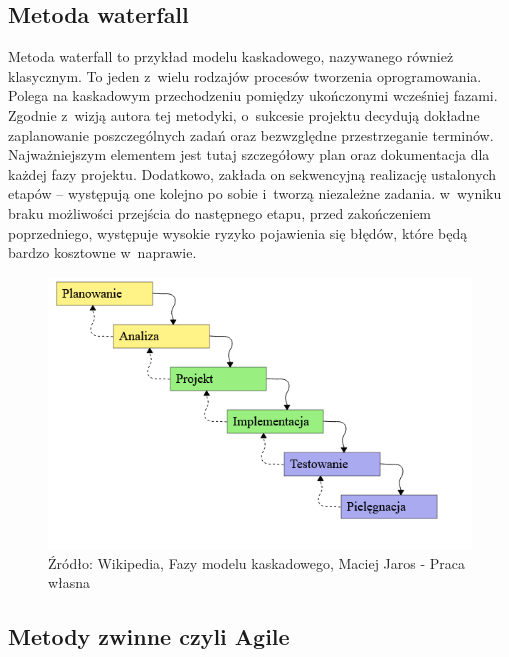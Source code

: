 \documentclass[oneside,polski,logo]{amuthesis}
\begin{document}
\subsection {Metoda waterfall}
Metoda waterfall to przykład modelu kaskadowego, nazywanego również klasycznym. To jeden z~wielu rodzajów procesów tworzenia oprogramowania. Polega na kaskadowym przechodzeniu pomiędzy ukończonymi wcześniej fazami. Zgodnie z~wizją autora tej metodyki, o~sukcesie projektu decydują dokładne zaplanowanie poszczególnych zadań oraz bezwzględne przestrzeganie terminów. Najważniejszym elementem jest tutaj szczegółowy plan oraz dokumentacja dla każdej fazy projektu. Dodatkowo, zakłada on sekwencyjną realizację ustalonych etapów – występują one kolejno po sobie i~tworzą niezależne zadania. w~wyniku braku możliwości przejścia do następnego etapu, przed zakończeniem poprzedniego, występuje wysokie ryzyko pojawienia się błędów, które będą bardzo kosztowne w~naprawie. \cite{waterfall}

\begin{figure}[h]
	\centering
	\includegraphics[width=14cm]{images/hyps/waterfall.png}
	\caption{Źródło: Wikipedia, Fazy modelu kaskadowego, Maciej Jaros - Praca własna}
\end{figure}

\subsection{Metody zwinne czyli Agile}
\end{document}
